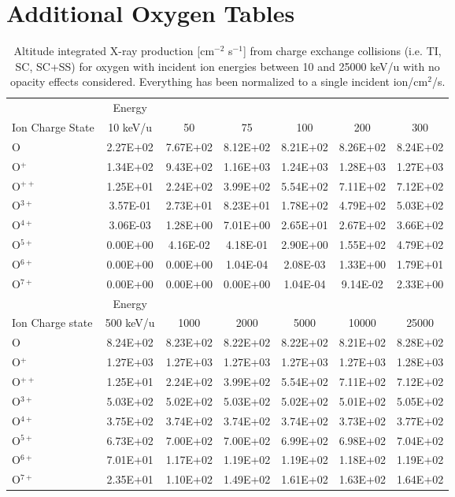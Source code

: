 \section{Additional Oxygen Tables}
\label{app:Oxy}

\begin{table}[ht]
    \centering
    \caption{Altitude integrated X-ray production [cm$^{-2}$ s$^{-1}$] from charge exchange collisions (i.e. TI, SC, SC+SS) for oxygen with incident ion energies between 10 and 25000 keV/u with no opacity effects considered. Everything has been normalized to a single incident ion/cm$^2$/s.}
    \begin{tabular}{l|c|c|c|c|c|c}
    \hline
    & Energy & & & & & \\
    Ion Charge State & 10 keV/u & 50 & 75 & 100 & 200 & 300 \\
    \hline
    O & 2.27E+02 & 7.67E+02 & 8.12E+02 & 8.21E+02 & 8.26E+02 & 8.24E+02 \\
    O$^+$ & 1.34E+02 & 9.43E+02 & 1.16E+03 & 1.24E+03 & 1.28E+03 & 1.27E+03 \\
    O$^{++}$ & 1.25E+01 & 2.24E+02 & 3.99E+02 & 5.54E+02 & 7.11E+02 & 7.12E+02 \\
    O$^{3+}$ & 3.57E-01 & 2.73E+01 & 8.23E+01 & 1.78E+02 & 4.79E+02 & 5.03E+02 \\
    O$^{4+}$ & 3.06E-03 & 1.28E+00 & 7.01E+00 & 2.65E+01 & 2.67E+02 & 3.66E+02 \\
    O$^{5+}$ & 0.00E+00 & 4.16E-02 & 4.18E-01 & 2.90E+00 & 1.55E+02 & 4.79E+02 \\
    O$^{6+}$ & 0.00E+00 & 0.00E+00 & 1.04E-04 & 2.08E-03 & 1.33E+00 & 1.79E+01 \\
    O$^{7+}$ & 0.00E+00 & 0.00E+00 & 0.00E+00 & 1.04E-04 & 9.14E-02 & 2.33E+00 \\
    \hline
    \hline
    & Energy & & & & & \\
    Ion Charge state & 500 keV/u & 1000 & 2000 & 5000 & 10000 & 25000 \\
    \hline
    O & 8.24E+02 & 8.23E+02 & 8.22E+02 & 8.22E+02 & 8.21E+02 & 8.28E+02 \\
    O$^+$ & 1.27E+03 & 1.27E+03 & 1.27E+03 & 1.27E+03 & 1.27E+03 & 1.28E+03 \\
    O$^{++}$ & 1.25E+01 & 2.24E+02 & 3.99E+02 & 5.54E+02 & 7.11E+02 & 7.12E+02 \\
    O$^{3+}$ & 5.03E+02 & 5.02E+02 & 5.03E+02 & 5.02E+02 & 5.01E+02 & 5.05E+02 \\
    O$^{4+}$ & 3.75E+02 & 3.74E+02 & 3.74E+02 & 3.74E+02 & 3.73E+02 & 3.77E+02 \\
    O$^{5+}$ & 6.73E+02 & 7.00E+02 & 7.00E+02 & 6.99E+02 & 6.98E+02 & 7.04E+02 \\
    O$^{6+}$ & 7.01E+01 & 1.17E+02 & 1.19E+02 & 1.19E+02 & 1.18E+02 & 1.19E+02 \\
    O$^{7+}$ & 2.35E+01 & 1.10E+02 & 1.49E+02 & 1.61E+02 & 1.63E+02 & 1.64E+02 \\
    \hline
    \end{tabular}
    \label{tab:OxyCXProd}
\end{table}


